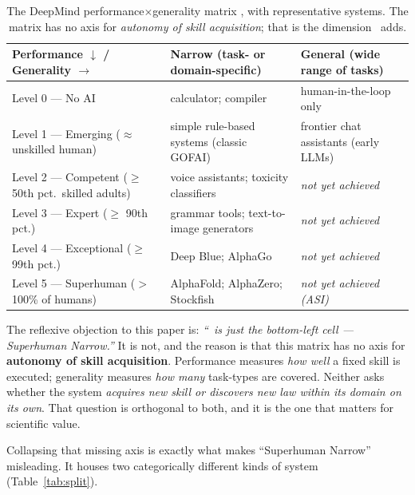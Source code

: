 \begin{table}[t]
\centering
\small
\caption{The DeepMind performance$\times$generality matrix \citep{morris2024}, with representative systems. The matrix has no axis for \emph{autonomy of skill acquisition}; that is the dimension \DCI\ adds.}
\label{tab:morris}
\begin{tabular}{@{}L{4.4cm}L{6.0cm}L{5.6cm}@{}}
\toprule
\textbf{Performance $\downarrow$ / Generality $\rightarrow$} & \textbf{Narrow} (task- or domain-specific) & \textbf{General} (wide range of tasks) \\
\midrule
Level 0 --- No AI & calculator; compiler & human-in-the-loop only \\
Level 1 --- Emerging ($\approx$ unskilled human) & simple rule-based systems (classic GOFAI) & frontier chat assistants (early LLMs) \\
Level 2 --- Competent ($\geq$ 50th pct.\ skilled adults) & voice assistants; toxicity classifiers & \emph{not yet achieved} \\
Level 3 --- Expert ($\geq$ 90th pct.) & grammar tools; text-to-image generators & \emph{not yet achieved} \\
Level 4 --- Exceptional ($\geq$ 99th pct.) & Deep Blue; AlphaGo & \emph{not yet achieved} \\
Level 5 --- Superhuman ($>$ 100\% of humans) & AlphaFold; AlphaZero; Stockfish & \emph{not yet achieved (ASI)} \\
\bottomrule
\end{tabular}
\end{table}

The reflexive objection to this paper is: \emph{``\DCI\ is just the bottom-left cell --- Superhuman Narrow.''} It is not, and the reason is that this matrix has no axis for \textbf{autonomy of skill acquisition}. Performance measures \emph{how well} a fixed skill is executed; generality measures \emph{how many} task-types are covered. Neither asks whether the system \emph{acquires new skill or discovers new law within its domain on its own}. That question is orthogonal to both, and it is the one that matters for scientific value.

Collapsing that missing axis is exactly what makes ``Superhuman Narrow'' misleading. It houses two categorically different kinds of system (Table~\ref{tab:split}).

